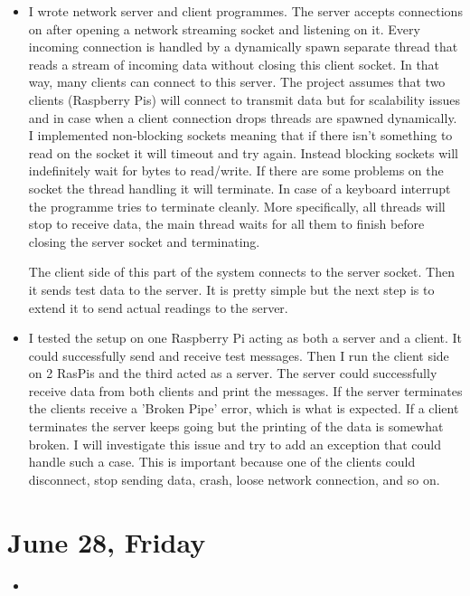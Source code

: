 \documentclass[a4paper,12pt]{article}
\begin{document}
\begin{itemize}
	\item I wrote network server and client programmes. The server accepts connections on after opening a network streaming socket and listening on it. Every incoming connection is handled by a dynamically spawn separate thread that reads a stream of incoming data without closing this client socket. In that way, many clients can connect to this server. The project assumes that two clients (Raspberry Pis) will connect to transmit data but for scalability issues and in case when a client connection drops threads are spawned dynamically. I implemented non-blocking sockets meaning that if there isn't something to read on the socket it will timeout and try again. Instead blocking sockets will indefinitely wait for bytes to read/write. If there are some problems on the socket the thread handling it will terminate. In case of a keyboard interrupt the programme tries to terminate cleanly. More specifically, all threads will stop to receive data, the main thread waits for all them to finish before closing the server socket and terminating.
	
	The client side of this part of the system connects to the server socket. Then it sends test data to the server. It is pretty simple but the next step is to extend it to send actual readings to the server.
	\item I tested the setup on one Raspberry Pi acting as both a server and a client. It could successfully send and receive test messages. Then I run the client side on 2 RasPis and the third acted as a server. The server could successfully receive data from both clients and print the messages. If the server terminates the clients receive a 'Broken Pipe' error, which is what is expected. If a client terminates the server keeps going but the printing of the data is somewhat broken. I will investigate this issue and try to add an exception that could handle such a case. This is important because one of the clients could disconnect, stop sending data, crash, loose network connection, and so on.
\end{itemize}

\section{June 28, Friday}

\begin{itemize}
	\item 
\end{itemize}

\newpage


\end{document}
